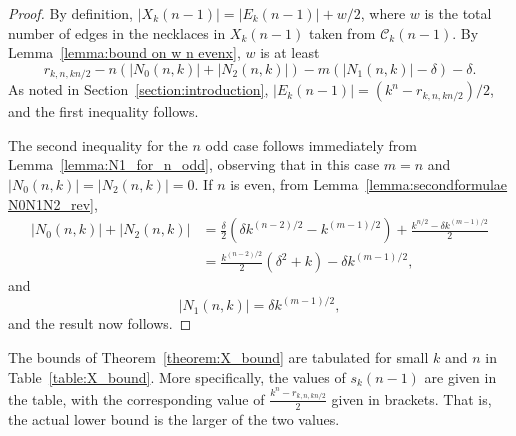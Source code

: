 \documentclass[a4paper,11pt]{article}
\theoremstyle{plain}
\theoremstyle{definition}
\theoremstyle{remark}
\begin{document}
\begin{proof}
By definition, $|X_k(n-1)|=|E_k(n-1)|+w/2$, where $w$ is the total number of edges in the necklaces
in $X_k(n-1)$ taken from $\mathcal{C}_k(n-1)$.  By Lemma~\ref{lemma:bound on w n evenx}, $w$ is at
least
\[ r_{k,n,kn/2} - n(|N_0(n,k)|+|N_2(n,k)|)-m(|N_1(n,k)|-\delta)-\delta. \]
As noted in Section~\ref{section:introduction}, $|E_k(n-1)|=(k^n-r_{k,n,kn/2})/2$, and the first
inequality follows.

The second inequality for the $n$ odd case follows immediately from Lemma~\ref{lemma:N1_for_n_odd},
observing that in this case $m=n$ and $|N_0(n,k)|=|N_2(n,k)|=0$. If $n$ is even, from
Lemma~\ref{lemma:secondformulae N0N1N2_rev},
\begin{equation*}
\begin{split}
|N_0(n,k)|+|N_2(n,k)| & = \frac{\delta}{2} (\delta k^{(n-2)/2}-k^{(m-1)/2})
+\frac{k^{n/2}-\delta k^{(m-1)/2}}{2} \\
& = \frac{k^{(n-2)/2}}{2}(\delta^2+k)-\delta k^{(m-1)/2},
\end{split}
\end{equation*}
and
\[ |N_1(n,k)|= \delta k^{(m-1)/2}, \]
and the result now follows.
\end{proof}




The bounds of Theorem~\ref{theorem:X_bound} are tabulated for small $k$ and $n$ in
Table~\ref{table:X_bound}. More specifically, the values of $s_k(n-1)$ are given in the table, with
the corresponding value of $\frac{k^n-r_{k,n,kn/2}}{2}$ given in brackets.  That is, the actual
lower bound is the larger of the two values.
\end{document}

